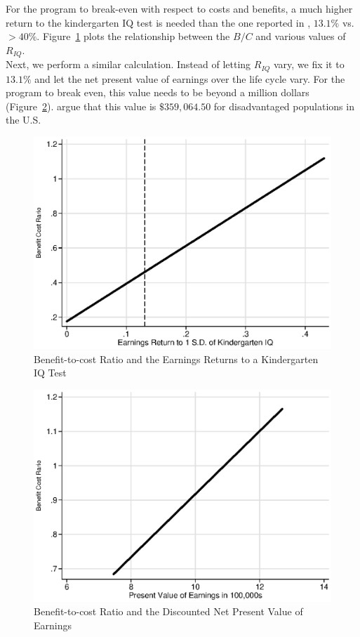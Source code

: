\noindent For the program to break-even with respect to costs and benefits, a much higher return to the kindergarten IQ test is needed than the one reported in \citep{Chetty_Friedman_etal_2010_HowDoesYour}, $13.1\%$ vs. $ > 40\%$. Figure~\ref{figure:first} plots the relationship between the $B/C$ and various values of $R_{IQ}$.\\ 

\noindent Next, we perform a similar calculation. Instead of letting $R_{IQ}$ vary, we fix it to $13.1\%$ and let the net present value of earnings over the life cycle vary. For the program to break even, this value needs to be beyond a million dollars (Figure~\ref{figuresecond}). \citet{Kline-Walters_2015_NBER-Evaluating} argue that this value is $\$359,064.50$ for disadvantaged populations in the U.S.

\begin{center}
\begin{figure}[H] 
\caption{Benefit-to-cost Ratio and the Earnings Returns to a Kindergarten IQ Test} \label{figure:first}
\centering
\includegraphics[width=.65\columnwidth]{Output/abc_chettytype_return.eps}
\end{figure}
\end{center}

\begin{center}
\begin{figure}[H] 
\caption{Benefit-to-cost Ratio and the Discounted Net Present Value of Earnings}
\label{figuresecond}
\centering
\includegraphics[width=.65\columnwidth]{Output/abc_chettytype_pv.eps}
\end{figure}
\end{center}